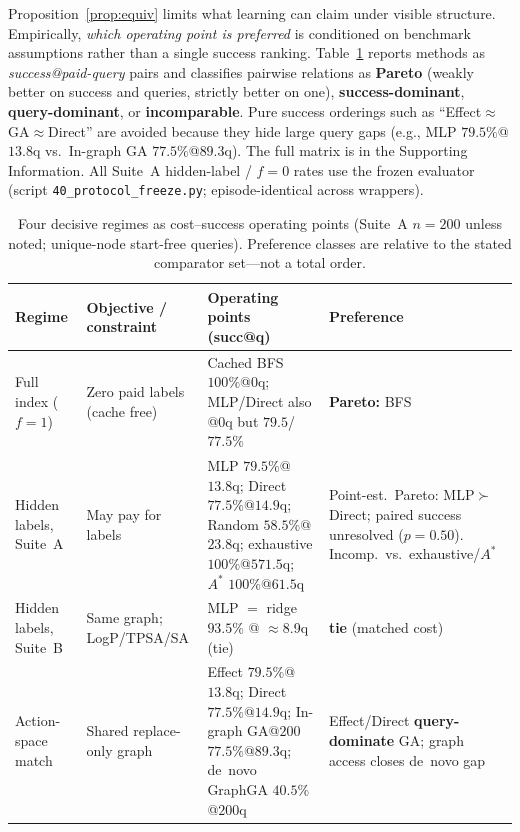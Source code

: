 Proposition~\ref{prop:equiv} limits what learning can claim under visible structure. Empirically, \emph{which operating point is preferred} is conditioned on benchmark assumptions rather than a single success ranking. Table~\ref{tab:regimes} reports methods as \emph{success@paid-query} pairs and classifies pairwise relations as \textbf{Pareto} (weakly better on success and queries, strictly better on one), \textbf{success-dominant}, \textbf{query-dominant}, or \textbf{incomparable}. Pure success orderings such as ``Effect$\approx$GA$\approx$Direct'' are avoided because they hide large query gaps (e.g., MLP $79.5\%$@$13.8$q vs.\ In-graph GA $77.5\%$@$89.3$q). The full matrix is in the Supporting Information. All Suite~A hidden-label / $f{=}0$ rates use the frozen evaluator (script \texttt{40\_protocol\_freeze.py}; episode-identical across wrappers).

\begin{table}[ht]
\caption{Four decisive regimes as cost--success operating points (Suite~A $n{=}200$ unless noted; unique-node start-free queries). Preference classes are relative to the stated comparator set---not a total order.}
\label{tab:regimes}
\centering
\small
\begin{tabular}{lp{3.2cm}p{4.6cm}l}
\toprule
Regime & Objective / constraint & Operating points (succ@q) & Preference \\
\midrule
Full index ($f{=}1$) &
Zero paid labels (cache free) &
Cached BFS $100\%$@$0$q; MLP/Direct also @$0$q but $79.5$/$77.5\%$ &
\textbf{Pareto:} BFS \\
Hidden labels, Suite~A &
May pay for labels &
MLP $79.5\%$@$13.8$q; Direct $77.5\%$@$14.9$q; Random $58.5\%$@$23.8$q; exhaustive $100\%$@$571.5$q; $A^\ast$ $100\%$@$61.5$q &
Point-est.\ Pareto: MLP$\succ$Direct; paired success unresolved ($p{=}0.50$). Incomp.\ vs.\ exhaustive/$A^\ast$ \\
Hidden labels, Suite~B &
Same graph; LogP/TPSA/SA &
MLP $=$ ridge $93.5\%$ @ $\approx$8.9q (tie) &
\textbf{tie} (matched cost) \\
Action-space match &
Shared replace-only graph &
Effect $79.5\%$@$13.8$q; Direct $77.5\%$@$14.9$q; In-graph GA@$200$ $77.5\%$@$89.3$q; de~novo GraphGA $40.5\%$@$200$q &
Effect/Direct \textbf{query-dominate} GA; graph access closes de~novo gap \\
\bottomrule
\end{tabular}
\end{table}
\FloatBarrier

